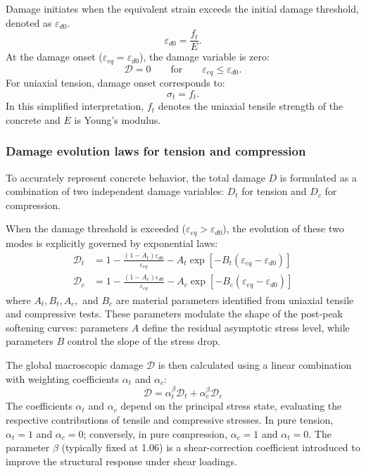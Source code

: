 Damage initiates when the equivalent strain exceeds the initial damage threshold, denoted as $\varepsilon_{d0}$.
\begin{equation}
    \varepsilon_{d0} = \frac{f_t}{E}.
\end{equation}
\noindent At the damage onset ($\varepsilon_{eq}=\varepsilon_{d0}$), the damage variable is zero:
\begin{equation}
    \mathcal{D} = 0 \qquad \text{for} \qquad \varepsilon_{eq} \le \varepsilon_{d0}.
\end{equation}
\noindent For uniaxial tension, damage onset corresponds to:
\begin{equation}
    \sigma_t = f_t.
\end{equation}
\noindent In this simplified interpretation, $f_t$ denotes the uniaxial tensile strength of the concrete and $E$ is Young's modulus.

\subsubsection{Damage evolution laws for tension and compression}
To accurately represent concrete behavior, the total damage $D$ is formulated as a combination of two independent damage variables: $D_t$ for tension and $D_c$ for compression. 

When the damage threshold is exceeded ($\varepsilon_{eq} > \varepsilon_{d0}$), the evolution of these two modes is explicitly governed by exponential laws:
\begin{align}
    \mathcal{D}_t &= 1 - \frac{(1 - A_t) \varepsilon_{d0}}{\varepsilon_{eq}} - A_t \exp\left[ -B_t (\varepsilon_{eq} - \varepsilon_{d0}) \right] \\
    \mathcal{D}_c &= 1 - \frac{(1 - A_c) \varepsilon_{d0}}{\varepsilon_{eq}} - A_c \exp\left[ -B_c (\varepsilon_{eq} - \varepsilon_{d0}) \right]
\end{align}
where $A_t, B_t, A_c,$ and $B_c$ are material parameters identified from uniaxial tensile and compressive tests. These parameters modulate the shape of the post-peak softening curves: parameters $A$ define the residual asymptotic stress level, while parameters $B$ control the slope of the stress drop.

The global macroscopic damage $\mathcal{D}$ is then calculated using a linear combination with weighting coefficients $\alpha_t$ and $\alpha_c$:
\begin{equation}
    \mathcal{D} = \alpha_t^\beta \mathcal{D}_t + \alpha_c^\beta \mathcal{D}_c
\end{equation}
The coefficients $\alpha_t$ and $\alpha_c$ depend on the principal stress state, evaluating the respective contributions of tensile and compressive stresses. In pure tension, $\alpha_t = 1$ and $\alpha_c = 0$; conversely, in pure compression, $\alpha_c = 1$ and $\alpha_t = 0$. The parameter $\beta$ (typically fixed at 1.06) is a shear-correction coefficient introduced to improve the structural response under shear loadings.

